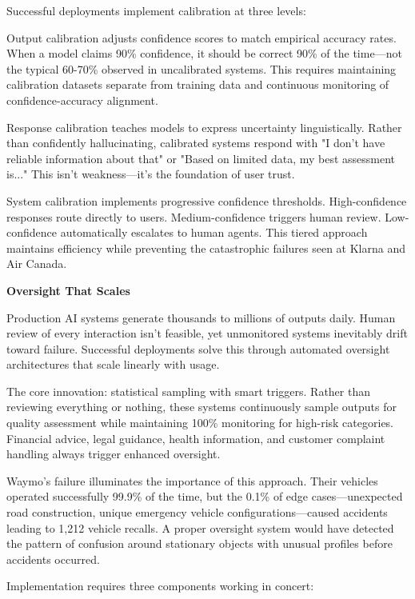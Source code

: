 \documentclass[a4paper,11pt]{article}
\begin{document}
Successful deployments implement calibration at three levels:


Output calibration adjusts confidence scores to match empirical accuracy rates. When a model claims 90\% confidence, it should be correct 90\% of the time—not the typical 60-70\% observed in uncalibrated systems. This requires maintaining calibration datasets separate from training data and continuous monitoring of confidence-accuracy alignment.


Response calibration teaches models to express uncertainty linguistically. Rather than confidently hallucinating, calibrated systems respond with "I don't have reliable information about that" or "Based on limited data, my best assessment is..." This isn't weakness—it's the foundation of user trust.


System calibration implements progressive confidence thresholds. High-confidence responses route directly to users. Medium-confidence triggers human review. Low-confidence automatically escalates to human agents. This tiered approach maintains efficiency while preventing the catastrophic failures seen at Klarna and Air Canada.


\textbf{Oversight That Scales}\par

Production AI systems generate thousands to millions of outputs daily. Human review of every interaction isn't feasible, yet unmonitored systems inevitably drift toward failure. Successful deployments solve this through automated oversight architectures that scale linearly with usage.


The core innovation: statistical sampling with smart triggers. Rather than reviewing everything or nothing, these systems continuously sample outputs for quality assessment while maintaining 100\% monitoring for high-risk categories. Financial advice, legal guidance, health information, and customer complaint handling always trigger enhanced oversight.


Waymo's failure illuminates the importance of this approach. Their vehicles operated successfully 99.9\% of the time, but the 0.1\% of edge cases—unexpected road construction, unique emergency vehicle configurations—caused accidents leading to 1,212 vehicle recalls. A proper oversight system would have detected the pattern of confusion around stationary objects with unusual profiles before accidents occurred.


Implementation requires three components working in concert:
\end{document}
